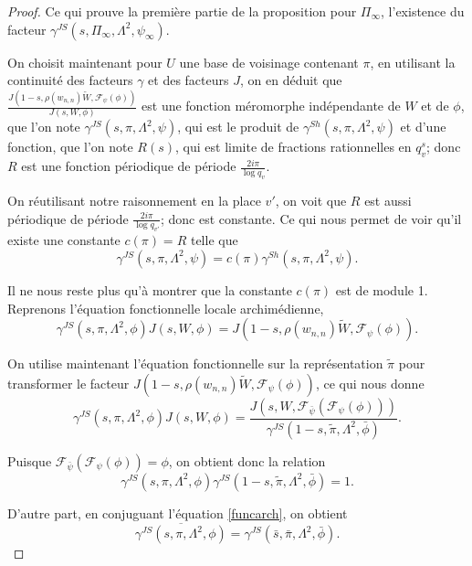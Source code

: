 \documentclass{amsart}
\begin{document}
\begin{proof}
 Ce qui prouve la première partie de la proposition pour $\Pi_\infty$, l'existence du facteur $\gamma^{JS}(s, \Pi_\infty, \Lambda^2, \psi_\infty)$.
 
 On choisit maintenant pour $U$ une base de voisinage contenant $\pi$, en utilisant la continuité des facteurs $\gamma$ et des facteurs $J$, on en déduit que $\frac{J(1-s, \rho(w_{n,n})\tilde{W}, \mathcal{F}_\psi(\phi))}{J(s, W, \phi)}$
 est une fonction méromorphe indépendante de $W$ et de $\phi$, que l'on note $\gamma^{JS}(s, \pi, \Lambda^2, \psi)$, qui est le produit de $\gamma^{Sh}(s, \pi, \Lambda^2, \psi)$ et d'une fonction, que l'on note $R(s)$, qui est limite de fractions rationnelles en $q_v^s$; donc $R$ est une fonction périodique de période $\frac{2i\pi}{\log q_v}$.
 
  On réutilisant notre raisonnement en la place $v'$, on voit que $R$ est aussi périodique de période $\frac{2i\pi}{\log q_{v'}}$; donc est constante. Ce qui nous permet de voir qu'il existe une constante $c(\pi)=R$ telle que
 \begin{equation}
 \gamma^{JS}(s, \pi, \Lambda^2, \psi) = c(\pi)\gamma^{Sh}(s, \pi, \Lambda^2, \psi).
 \end{equation}
 
 Il ne nous reste plus qu'à montrer que la constante $c(\pi)$ est de module 1. Reprenons l'équation fonctionnelle locale archimédienne,
 \begin{equation}
 \label{funcarch}
 \gamma^{JS}(s, \pi, \Lambda^2, \phi) J(s, W, \phi) = J(1-s, \rho(w_{n,n})\tilde{W}, \mathcal{F}_\psi(\phi)).
 \end{equation}
 
 On utilise maintenant l'équation fonctionnelle sur la représentation $\tilde{\pi}$ pour transformer le facteur $J(1-s, \rho(w_{n,n})\tilde{W}, \mathcal{F}_\psi(\phi))$, ce qui nous donne
 \begin{equation}
 \gamma^{JS}(s, \pi, \Lambda^2, \phi) J(s, W, \phi) = \frac{J(s, W, \mathcal{F}_{\bar{\psi}}(\mathcal{F}_\psi(\phi)))}{\gamma^{JS}(1-s, \tilde{\pi}, \Lambda^2, \bar{\phi})}.
 \end{equation}
 
 Puisque $\mathcal{F}_{\bar{\psi}}(\mathcal{F}_\psi(\phi)) = \phi$, on obtient donc la relation 
 \begin{equation}
 \gamma^{JS}(s, \pi, \Lambda^2, \phi)\gamma^{JS}(1-s, \tilde{\pi}, \Lambda^2, \bar{\phi}) = 1.
 \end{equation}
 
 D'autre part, en conjuguant l'équation \ref{funcarch}, on obtient
 \begin{equation}
 \overline{\gamma^{JS}(s, \pi, \Lambda^2, \phi)} = \gamma^{JS}(\bar{s}, \bar{\pi}, \Lambda^2, \bar{\phi}).
 \end{equation}
 

\end{proof}
\end{document}
